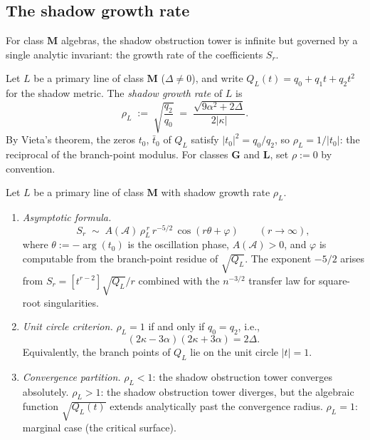 \subsection{The shadow growth rate}

For class $\mathbf{M}$ algebras, the shadow obstruction tower is infinite
but governed by a single analytic invariant: the growth rate of
the coefficients $S_r$.

\begin{definition}
\label{def:shadow-growth-rate}
Let $L$ be a primary line of class $\mathbf{M}$ ($\Delta \neq 0$),
and write $Q_L(t) = q_0 + q_1 t + q_2 t^2$ for the shadow metric.
The \emph{shadow growth rate} of $L$ is
\begin{equation}
\label{eq:shadow-growth-rate}
 \rho_L \;:=\; \sqrt{\frac{q_2}{q_0}}
 \;=\;
 \frac{\sqrt{9\alpha^2 + 2\Delta}}{2|\kappa|}.
\end{equation}
By Vieta's theorem, the zeros $t_0$, $\bar{t}_0$ of $Q_L$
satisfy $|t_0|^2 = q_0/q_2$, so
$\rho_L = 1/|t_0|$: the reciprocal of the branch-point modulus.
For classes $\mathbf{G}$ and $\mathbf{L}$, set $\rho := 0$
by convention.
\end{definition}

\begin{theorem}
\label{thm:shadow-asymptotics}
Let $L$ be a primary line of class $\mathbf{M}$ with shadow
growth rate $\rho_L$.
\begin{enumerate}[label=\textup{(\roman*)}]
\item \emph{Asymptotic formula.}
 \begin{equation}
 \label{eq:shadow-asymptotic-formula}
 S_r \;\sim\; A(\mathcal{A})\,\rho_L^{\,r}\,r^{-5/2}\,
 \cos(r\theta + \varphi)
 \qquad (r \to \infty),
 \end{equation}
 where $\theta := -\arg(t_0)$ is the oscillation phase,
 $A(\mathcal{A}) > 0$, and $\varphi$ is computable from the
 branch-point residue of $\sqrt{Q_L}$. The exponent $-5/2$
 arises from $S_r = [t^{r-2}]\sqrt{Q_L}/r$ combined with the
 $n^{-3/2}$ transfer law for square-root singularities.

\item \emph{Unit circle criterion.}
 $\rho_L = 1$ if and only if $q_0 = q_2$, i.e.,
 \begin{equation}
 \label{eq:unit-circle-criterion}
 (2\kappa - 3\alpha)(2\kappa + 3\alpha) = 2\Delta.
 \end{equation}
 Equivalently, the branch points of $Q_L$ lie on the unit
 circle $|t| = 1$.

\item \emph{Convergence partition.}
 $\rho_L < 1$: the shadow obstruction tower converges
 absolutely.
 $\rho_L > 1$: the shadow obstruction tower diverges, but the algebraic
 function $\sqrt{Q_L(t)}$ extends analytically past the
 convergence radius.
 $\rho_L = 1$: marginal case (the critical surface).
\end{enumerate}
\end{theorem}

